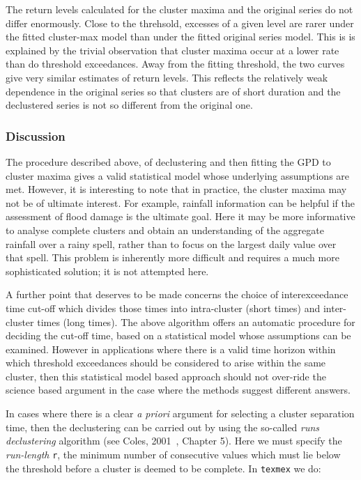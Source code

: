 \documentclass[10pt]{article}\usepackage[]{graphicx}\usepackage[]{color}
\begin{document}
The return levels calculated for the cluster maxima and the original series do not differ enormously.  Close to the threhsold, excesses of a given level are rarer under the fitted cluster-max model than under the fitted original series model.  This is is explained by the trivial observation that cluster maxima occur at a lower rate than do threshold exceedances.  Away from the fitting threshold, the two curves give very similar estimates of return levels.  This reflects the relatively weak dependence in the original series so that clusters are of short duration and the declustered series is not so different from the original one.

\subsubsection*{Discussion}

The procedure described above, of declustering and then fitting the GPD to cluster maxima gives a valid statistical model whose underlying assumptions are met.  However, it is interesting to note that in practice, the cluster maxima may not be of ultimate interest. For example, rainfall information can be helpful if the assessment of flood damage is the ultimate goal.  Here it may be more informative to analyse complete clusters and obtain an understanding of  the aggregate rainfall over a rainy spell, rather than to focus on the largest daily value over that spell.  This problem is inherently more difficult and requires a much more sophisticated solution; it is not attempted here.

A further point that deserves to be made concerns the choice of interexceedance time cut-off which divides those times into intra-cluster (short times) and inter-cluster times (long times).  The above algorithm offers an automatic procedure for deciding the cut-off time, based on a statistical model whose assumptions can be examined.  However in applications where there is a valid time horizon within which threshold exceedances should be considered to arise within the same cluster, then this statistical model based approach should not over-ride the science based argument in the case where the methods suggest different answers.

In cases where there is a clear {\it a priori} argument for selecting a cluster separation time, then the declustering can be carried out by using the so-called {\it runs declustering} algorithm (see Coles, 2001~\cite{coles}, Chapter 5).  Here we must specify the {\it run-length} {\tt r}, the minimum number of consecutive values which must lie below the threshold before a cluster is deemed to be complete.  In {\tt texmex} we do:
\end{document}
